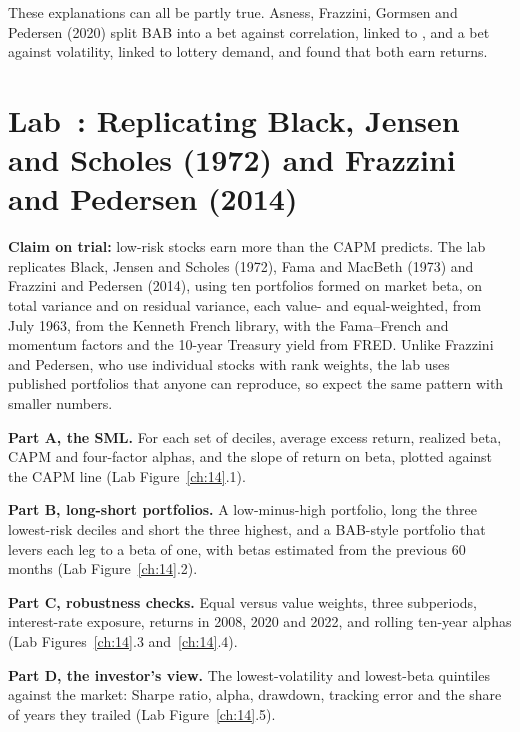These explanations can all be partly true. Asness, Frazzini, Gormsen and Pedersen (2020) split BAB into a bet against correlation, linked to , and a bet against volatility, linked to lottery demand, and found that both earn returns.

\section{Lab~\thechapter: Replicating Black, Jensen and Scholes (1972) and Frazzini and Pedersen (2014)}
\label{sec:18-lab}

\textbf{Claim on trial:} low-risk stocks earn more than the CAPM predicts. The lab replicates Black, Jensen and Scholes (1972), Fama and MacBeth (1973) and Frazzini and Pedersen (2014), using ten portfolios formed on market beta, on total variance and on residual variance, each value- and equal-weighted, from July 1963, from the Kenneth French library, with the Fama--French and momentum factors and the 10-year Treasury yield from FRED. Unlike Frazzini and Pedersen, who use individual stocks with rank weights, the lab uses published portfolios that anyone can reproduce, so expect the same pattern with smaller numbers.

\textbf{Part A, the SML.} For each set of deciles, average excess return, realized beta, CAPM and four-factor alphas, and the slope of return on beta, plotted against the CAPM line (Lab Figure~\ref{ch:14}.1).

\textbf{Part B, long-short portfolios.} A low-minus-high portfolio, long the three lowest-risk deciles and short the three highest, and a BAB-style portfolio that levers each leg to a beta of one, with betas estimated from the previous 60 months (Lab Figure~\ref{ch:14}.2).

\textbf{Part C, robustness checks.} Equal versus value weights, three subperiods, interest-rate exposure, returns in 2008, 2020 and 2022, and rolling ten-year alphas (Lab Figures~\ref{ch:14}.3 and~\ref{ch:14}.4).

\textbf{Part D, the investor's view.} The lowest-volatility and lowest-beta quintiles against the market: Sharpe ratio, alpha, drawdown, tracking error and the share of years they trailed (Lab Figure~\ref{ch:14}.5).

